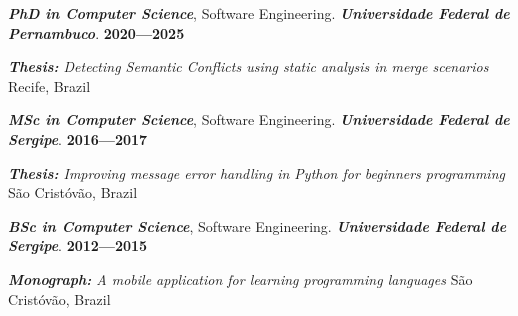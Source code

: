 

\textit{\textbf{PhD in Computer Science}}, Software Engineering. \textit{\textbf{Universidade Federal de Pernambuco}}. \hfill\textbf{2020---2025} \par
\textit{\textbf{Thesis:} Detecting Semantic Conflicts using static analysis in merge scenarios} \hfill{Recife, Brazil} \par

\textit{\textbf{MSc in Computer Science}}, Software Engineering.  \textit{\textbf{Universidade Federal de Sergipe}}. \hfill\textbf{2016---2017} \par
\textit{\textbf{Thesis:} Improving message error handling in Python for beginners programming} \hfill{São Cristóvão, Brazil} \par

\textit{\textbf{BSc in Computer Science}}, Software Engineering. \textit{\textbf{Universidade Federal de Sergipe}}. \hfill\textbf{2012---2015} \par
\textit{\textbf{Monograph:} A mobile application for learning programming languages} \hfill{São Cristóvão, Brazil} \par